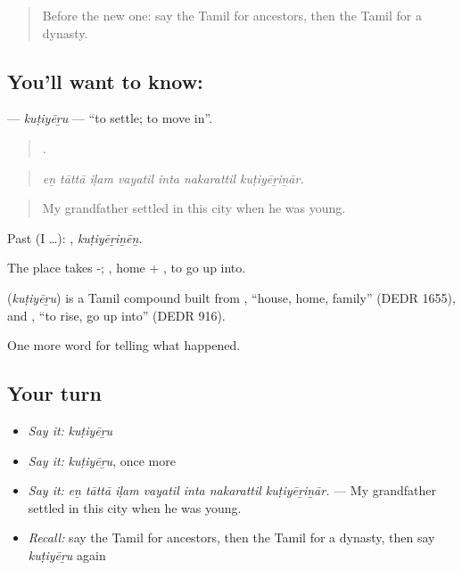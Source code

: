 \label{lesson:TA-C327-kutiyeru}



\begin{quote}
Before the new one: say the Tamil for ancestors, then the Tamil for a dynasty.
\end{quote}

\subsection*{You'll want to know: }
\textbf{} — \emph{kuṭiyēṟu} — \textquotedblleft{}to settle; to move in\textquotedblright{}.

\begin{quote}
      .
\end{quote}

\begin{quote}
\emph{eṉ tāttā iḷam vayatil inta nakarattil kuṭiyēṟiṉār.}
\end{quote}

\begin{quote}
My grandfather settled in this city when he was young.
\end{quote}

Past (I …): , \emph{kuṭiyēṟiṉēṉ}.

The place takes -; , home + , to go up into.

\begin{cousinweb}
\textbf{} (\emph{kuṭiyēṟu}) is a Tamil compound built from , \textquotedblleft{}house, home, family\textquotedblright{} (DEDR 1655), and , \textquotedblleft{}to rise, go up into\textquotedblright{} (DEDR 916).
\end{cousinweb}

\begin{grammarlens}[title={What you've built}]
One more word for telling what happened.
\end{grammarlens}

\subsection*{Your turn}
\begin{itemize}
\raggedright
  \item \emph{Say it:} \emph{kuṭiyēṟu}
  \item \emph{Say it:} \emph{kuṭiyēṟu}, once more
  \item \emph{Say it:} \emph{eṉ tāttā iḷam vayatil inta nakarattil kuṭiyēṟiṉār.} — My grandfather settled in this city when he was young.
  \item \emph{Recall:} say the Tamil for ancestors, then the Tamil for a dynasty, then say \emph{kuṭiyēṟu} again
\end{itemize}

